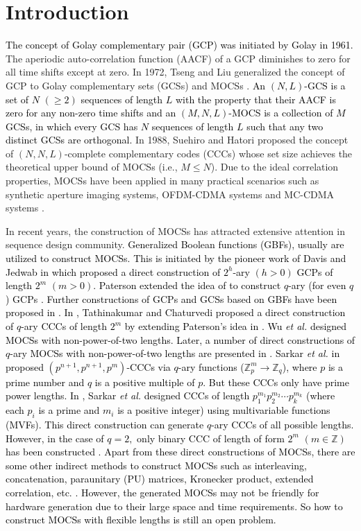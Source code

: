\documentclass[11pt]{article}
\newcommand{\2} {$2$-to-$1$}
\begin{document}
\section{Introduction}
\textcolor{black}{The concept of Golay complementary pair (GCP) was initiated by Golay in 1961\cite{MG}.} The aperiodic auto-correlation function (AACF) of a GCP diminishes to zero for all time shifts except at zero.  In 1972, Tseng and Liu generalized the concept of GCP to Golay complementary sets (GCSs) and MOCSs \cite{CC1}. \textcolor{black}{An $(N,L)$-GCS is a set of $N$ $(\geq 2)$ sequences of length $L$ with the property that their AACF is zero for any non-zero time shifts and an $(M,N,L)$-MOCS is a collection of $M$ GCSs, in which every GCS has  $N$ sequences of length $L$ such that any two distinct GCSs are orthogonal.} In 1988, Suehiro and Hatori proposed the concept of $(N,N,L)$-complete complementary codes (CCCs) whose set size achieves the theoretical upper bound of MOCSs (i.e., $M\leq N$)\cite{SN}. Due to the ideal correlation properties,
MOCSs have been applied in many practical scenarios such as synthetic aperture imaging systems\cite{TY}, OFDM-CDMA systems \cite{ZZ} and MC-CDMA systems \cite{TS,AJ,LZ}. 

In recent years, the construction of MOCSs has attracted extensive attention in sequence design community. \textcolor{black}{Generalized Boolean functions (GBFs), usually are utilized to construct MOCSs. This is initiated by the pioneer work of Davis and Jedwab in \cite{JAD} which proposed a direct construction of $2^h$-ary $(h>0)$ GCPs of length $2^m$ $(m>0)$. Paterson extended the idea of \cite{JAD} to construct $q$-ary (for even $q$) GCPs \cite{PK}. Further constructions of GCPs and GCSs based on GBFs have been proposed in \cite{YL2,CY2}. 
In \cite{AR}, Tathinakumar and Chaturvedi proposed a direct construction of $q$-ary CCCs of length $2^m$ by extending Paterson's idea in \cite{PK}. Wu \textit{et al.} \cite{SW} designed MOCSs with non-power-of-two lengths.  Later, a number of direct constructions of $q$-ary MOCSs with non-power-of-two lengths are presented in \cite{LT,KM}. Sarkar \textit{et al.}  in \cite{SP5} proposed $(p^{n+1},p^{n+1},p^m)$-CCCs via $q$-ary functions ($\mathbb{Z}_{p}^{m}\rightarrow \mathbb{Z}_{q}$), where  $p$  is a prime number and $q$ is a positive multiple of $p$. But these CCCs only have  prime power lengths.
In \cite{PS2}, Sarkar \textit{et al.}  designed  CCCs of length $p_1^{m_1}p_2^{m_2}\cdots p_k^{m_k}$ (where each $p_i$ is a prime and $m_i$ is a  positive integer)  using multivariable functions (MVFs)\cite{PS2}. This direct construction can generate $q$-ary CCCs of all possible lengths. However, in the case of $q=2,$ only binary CCC of length of form $2^m$ $(m\in \mathbb{Z})$ has been constructed \cite{PS2}. Apart from these direct constructions of MOCSs, there are some other indirect methods to construct MOCSs such as interleaving, concatenation, paraunitary (PU) matrices, Kronecker product, extended correlation, etc.  \cite{XC,YJ,ZG,KL,SD1,SD2}. However, the generated MOCSs  may not be friendly for hardware generation due to their large space and time requirements. So how to  construct  MOCSs with flexible lengths is still an open problem.}
\end{document}
